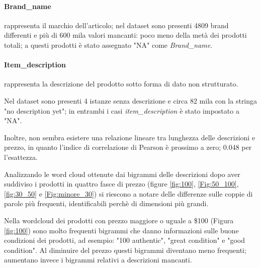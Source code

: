 \paragraph{Brand\_name} rappresenta il marchio dell'articolo; nel dataset sono
presenti 4809 brand differenti e più di 600 mila valori mancanti: poco meno
della metà dei prodotti totali; a questi prodotti è stato assegnato "NA" come \textit{Brand\_name}.

\paragraph{Item\_description} rappresenta la descrizione del prodotto sotto forma
di dato non strutturato.

Nel dataset sono presenti 4 istanze senza descrizione e
circa 82 mila con la stringa "no description yet"; in entrambi i casi
\textit{item\_description} è stato impostato a "NA".

Inoltre, non sembra esistere una relazione lineare tra lunghezza delle
descrizioni e prezzo, in quanto l'indice di correlazione di Pearson è prossimo a
zero; 0.048 per l'esattezza.

Analizzando le word cloud ottenute dai bigrammi delle descrizioni dopo aver
suddiviso i prodotti in quattro fasce di prezzo (figure \ref{fig:100},
\ref{Fig:50_100}, \ref{fig:30_50} e \ref{Fig:minore_30}) si riescono a notare
delle differenze sulle coppie di parole più frequenti, identificabili perchè di
dimensioni più grandi.

Nella wordcloud dei prodotti con prezzo maggiore o uguale a \$100 (Figura
\ref{fig:100}) sono molto frequenti bigrammi che danno informazioni sulle buone
condizioni dei prodotti, ad esempio: "100 authentic", "great condition" e "good
condition". Al diminuire del prezzo questi bigrammi diventano meno frequenti;
aumentano invece i bigrammi relativi a descrizioni mancanti.

